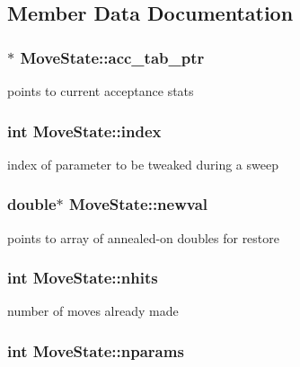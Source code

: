 \subsection{Member Data Documentation}
\hypertarget{structMoveState_aaa046f50dfa641c635e4f7a307c60e99}{
\subsubsection[{acc\_\-tab\_\-ptr}]{$\ast$ {\bf MoveState::acc\_\-tab\_\-ptr}}}
\label{structMoveState_aaa046f50dfa641c635e4f7a307c60e99}
points to current acceptance stats \hypertarget{structMoveState_ac7e613b0362356f428c7e1e5bcf09fd5}{
\subsubsection[{index}]{\setlength{\rightskip}{0pt plus 5cm}int {\bf MoveState::index}}}
\label{structMoveState_ac7e613b0362356f428c7e1e5bcf09fd5}
index of parameter to be tweaked during a sweep \hypertarget{structMoveState_a8f1f4ff4625f8c26fe9440979696b948}{
\subsubsection[{newval}]{\setlength{\rightskip}{0pt plus 5cm}double$\ast$ {\bf MoveState::newval}}}
\label{structMoveState_a8f1f4ff4625f8c26fe9440979696b948}
points to array of annealed-\/on doubles for restore \hypertarget{structMoveState_a17a8c4927f949245cdc6a6508e927b6b}{
\subsubsection[{nhits}]{\setlength{\rightskip}{0pt plus 5cm}int {\bf MoveState::nhits}}}
\label{structMoveState_a17a8c4927f949245cdc6a6508e927b6b}
number of moves already made \hypertarget{structMoveState_a22129990f5089434d62c9f7dbede353c}{
\subsubsection[{nparams}]{\setlength{\rightskip}{0pt plus 5cm}int {\bf MoveState::nparams}}}
